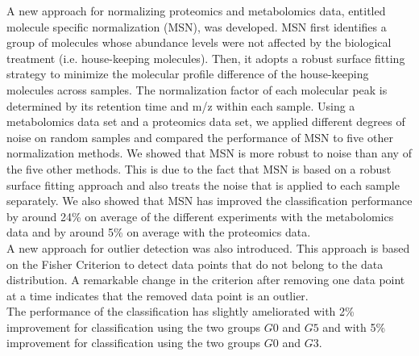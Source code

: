 A new approach for normalizing proteomics and metabolomics data, entitled molecule specific normalization (MSN), was developed. MSN first identifies a group of molecules whose abundance levels were not affected by the biological treatment (i.e. house-keeping molecules). Then, it adopts a robust surface fitting strategy to minimize the molecular profile difference of the house-keeping molecules across samples. The normalization factor of each molecular peak is determined by its retention time and m/z within each sample. Using a metabolomics data set and a proteomics data set, we applied different degrees of noise on random samples and compared the performance of MSN to five other normalization methods. We showed that MSN is more robust to noise than any of the five other methods. This is due to the fact that MSN is based on a robust surface fitting approach and also treats the noise that is applied to each sample separately. We also showed that MSN has improved the classification performance by around 24\% on average of the different experiments with the metabolomics data and by around 5\% on average with the proteomics data. \\
\indent A new approach for outlier detection was also introduced. This approach is based on the Fisher Criterion to detect data points that do not belong to the data distribution. A remarkable change in the criterion after removing one data point at a time indicates that the removed data point is an outlier.\\
The performance of the classification has slightly ameliorated with 2\% improvement for classification using the two groups $G0$ and $G5$ and with 5\% improvement for classification using the two groups $G0$ and $G3$.


